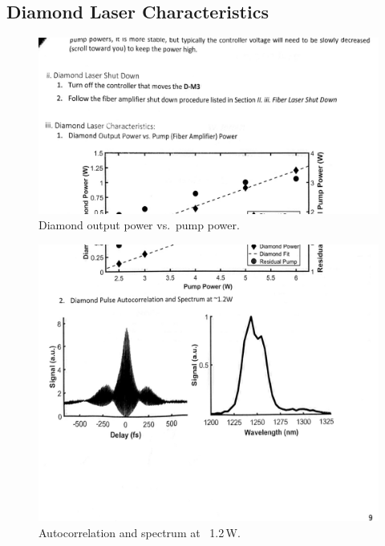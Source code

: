 \documentclass{article}
\begin{document}
\subsection{Diamond Laser Characteristics}
\begin{figure}[ht]
  \centering
  \includegraphics[width=0.8\linewidth]{diamond_power_curve.png}
  \caption{Diamond output power vs.\ pump power.}
\end{figure}
\begin{figure}[ht]
  \centering
  \includegraphics[width=0.8\linewidth]{diamond_autocorr_spectrum_1.2W.png}
  \caption{Autocorrelation and spectrum at ~1.2\,W.}
\end{figure}
\end{document}
